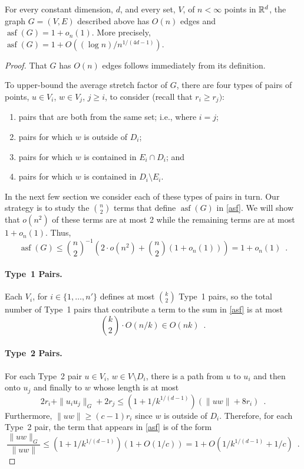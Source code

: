 \documentclass{patmorin}
\DeclareMathOperator{\asf}{asf}
\begin{document}
\begin{thm}
  For every constant dimension, $d$, and every set, $V$, of
  $n<\infty$ points in $\mathbb{R}^d$, the graph $G=(V,E)$ described above
  has $O(n)$ edges and $\asf(G)=1+o_n(1)$.  More precisely,
  $\asf(G)=1+O((\log n)/n^{1/(4d-1)})$.
\end{thm}

\begin{proof}
  That $G$ has $O(n)$ edges follows immediately from its definition.

  To upper-bound the average stretch factor of $G$, there are four types
  of pairs of points, $u\in V_i$, $w\in V_j$, $j\ge i$, to consider
  (recall that $r_i \ge r_j)$:
  \begin{enumerate}
    \item pairs that are both from the same set; i.e., where $i=j$;
    \item pairs for which $w$ is outside of $D_i$;
    \item pairs for which $w$ is contained in $E_i\cap D_i$; and
    \item pairs for which $w$ is contained in $D_i\setminus E_i$.
  \end{enumerate}
  In the next few section we consider each of these types of pairs in
  turn.  Our strategy is to study the $\binom{n}{2}$ terms that define
  $\asf(G)$ in \eqref{asf}.  We will show that $o(n^2)$ of these terms
  are at most 2 while the remaining terms are at most $1+o_n(1)$.  Thus,
  \[
     \asf(G)\le \binom{n}{2}^{-1}\left(2\cdot o(n^2)
                                       +\binom{n}{2}(1+o_n(1))\right)
     = 1+o_n(1) \enspace .
  \]

  \paragraph{Type~1 Pairs.}
  Each $V_i$, for $i\in\{1,\ldots,n'\}$ defines at most $\binom{k}{2}$
  Type~1 pairs, so the total number of Type~1 pairs that contribute a
  term to the sum in \eqref{asf} is at most
  \[
    \binom{k}{2}\cdot O(n/k) \in O(nk)
      \enspace .
  \]

  \paragraph{Type~2 Pairs.}
  For each Type~2 pair $u\in V_i$, $w\in V\setminus D_i$, there is a path
  from $u$ to $u_i$ and then onto $u_j$ and finally to $w$ whose length
  is at most
  \[
     2r_i + \|u_iu_j\|_G + 2r_j
      \le (1+1/k^{1/(d-1)})(\|uw\| + 8r_i) \enspace .
  \]
  Furthermore, $\|uw\|\ge (c-1)r_i$ since $w$ is outside of $D_i$.
  Therefore, for each Type~2 pair, the term that appears in \eqref{asf}
  is of the form
  \[
    \frac{\|uw\|_G}{\|uw\|}\le (1+1/k^{1/(d-1)})(1+O(1/c)) 
       = 1+O(1/k^{1/(d-1)}+1/c) \enspace .
  \]


\end{proof}
\end{document}
